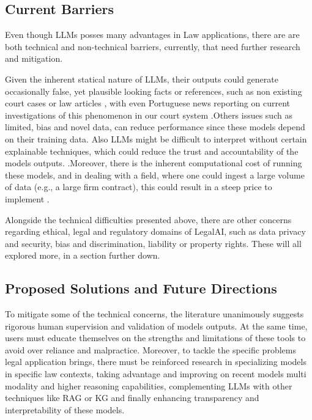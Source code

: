 \documentclass[11pt,a4paper,twoside,openright]{book}
\begin{document}





\subsection{Current Barriers}
Even though LLMs posses many advantages in Law applications, there are  are both technical and non-technical barriers, currently, that need further research and mitigation.
\par Given the inherent statical nature of LLMs, their outputs could generate occasionally false, yet plausible looking facts or references, such as non existing court cases or law articles \parencite{armour_augmented_lawer_2020,surden_chatgpt_AI_llms_law_2023}, with even Portuguese news reporting on current investigations of this phenomenon in our court system \parencite{publico2025alegado}.Others issues such as limited, bias and novel data, can reduce performance since these models depend on their training data. Also LLMs might be difficult to interpret without certain explainable techniques, which could reduce the trust and accountability of the models outputs. \parencite{armour_augmented_lawer_2020,surden_chatgpt_AI_llms_law_2023}.Moreover, there is the inherent computational cost of running these models, and in dealing with a field, where one could ingest a large volume of data (e.g., a large firm contract), this could result in a steep price to implement \parencite{armour_augmented_lawer_2020,surden_chatgpt_AI_llms_law_2023}.

\par Alongside the technical difficulties presented above, there are other concerns regarding ethical, legal and regulatory domains of LegalAI, such as data privacy and security, bias and discrimination, liability or property rights. These will all explored more, in a section further down.




\subsection{Proposed Solutions and Future Directions}
To mitigate some of the technical concerns, the literature unanimously suggests rigorous human supervision and validation of models outputs. At the same time, users must educate themselves on the strengths and limitations of these tools to avoid over reliance and malpractice. Moreover, to tackle the specific problems legal application brings, there must be reinforced research in specializing models in specific law contexts, taking advantage and improving on recent models multi modality and higher reasoning capabilities, complementing LLMs with other techniques like RAG or KG and finally enhancing transparency and interpretability of these models.\parencite{surden_chatgpt_AI_llms_law_2023,siino_exploring_llms_law_2025}
\end{document}
